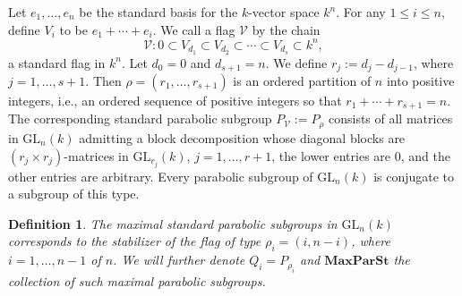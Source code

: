\documentclass[12pt]{article} %
\newtheorem{definition}{Definition}[section]
\begin{document}
Let \( e_1, \ldots, e_n \) be the standard basis for the \( k \)-vector space \( k^n \). For any \( 1 \leq i \leq n \), define \( V_i \) to be \( e_1 + \cdots + e_i \). We call a flag \( \mathcal{V} \) by the chain
\[
    \mathcal{V}: 0 \subset V_{d_1} \subset V_{d_2} \subset \cdots \subset V_{d_s} \subset k^n,
\]
a standard flag in \( k^n \). Let \( d_0 = 0 \) and \( d_{s+1} = n \). We define \( r_j := d_j - d_{j-1} \), where \( j = 1, \ldots, s+1 \). Then \( \rho = (r_1, \ldots, r_{s+1}) \) is an ordered partition of \( n \) into positive integers, i.e., an ordered sequence of positive integers so that \( r_1 + \cdots + r_{s+1} = n \). The corresponding standard parabolic subgroup \( P_{\mathcal{V}} := P_{\rho} \) consists of all matrices in \( \text{GL}_n(k) \) admitting a block decomposition whose diagonal blocks are \( (r_j \times r_j) \)-matrices in \( \text{GL}_{r_j}(k) \), \( j = 1, \ldots, r+1 \), the lower entries are 0, and the other entries are arbitrary. Every parabolic subgroup of \( \text{GL}_n(k) \) is conjugate to a subgroup of this type.
\begin{definition}
    The maximal standard parabolic subgroups in $\text{GL}_n(k)$ corresponds to the
    stabilizer of the flag of type $\rho_i =(i,n-i)$, where $i = 1,\ldots,n-1$ of $n$. We will
    further denote $Q_i = P_{\rho_i}$ and $\textbf{MaxParSt}$ the collection of such maximal parabolic subgroups.
\end{definition}
\end{document}
